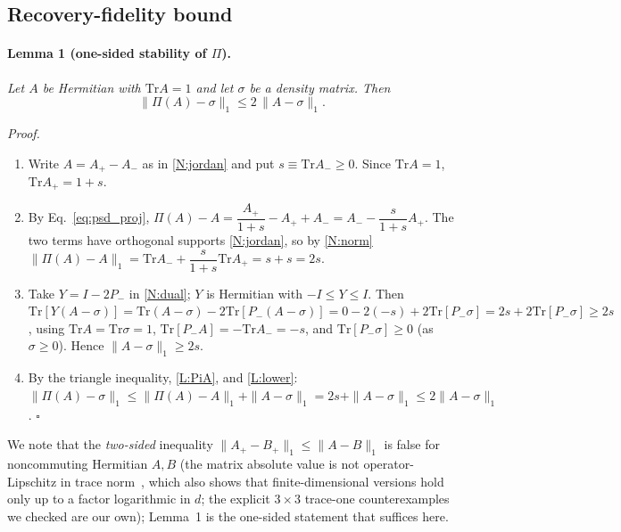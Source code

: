 \documentclass[12pt,a4paper]{article}
\newcommand{\tr}{\mathrm{Tr}}
\begin{document}
\subsection{Recovery-fidelity bound}
\label{sec:lipschitz_proof}

\paragraph{Lemma 1 (one-sided stability of $\Pi$).}
\label{lemma:lipschitz}
\textit{Let $A$ be Hermitian with $\tr A = 1$ and let $\sigma$ be a density matrix. Then}
\begin{equation}
\|\Pi(A) - \sigma\|_1 \leq 2\,\|A - \sigma\|_1 .
\label{eq:lemma1}
\end{equation}

\noindent\textit{Proof.}
\begin{enumerate}[label=(L\arabic*),leftmargin=3em]
\item \label{L:setup} Write $A = A_+ - A_-$ as in \ref{N:jordan} and put $s \equiv \tr A_- \geq 0$. Since $\tr A = 1$, $\tr A_+ = 1 + s$.
\item \label{L:PiA} By Eq.~\eqref{eq:psd_proj}, $\Pi(A) - A = \dfrac{A_+}{1+s} - A_+ + A_- = A_- - \dfrac{s}{1+s}A_+$.
The two terms have orthogonal supports \ref{N:jordan}, so by \ref{N:norm}
$\|\Pi(A) - A\|_1 = \tr A_- + \dfrac{s}{1+s}\tr A_+ = s + s = 2s$.
\item \label{L:lower} Take $Y = I - 2P_-$ in \ref{N:dual}; $Y$ is Hermitian with $-I \leq Y \leq I$. Then
$\tr[Y(A - \sigma)] = \tr(A - \sigma) - 2\tr[P_-(A - \sigma)] = 0 - 2(-s) + 2\tr[P_-\sigma] = 2s + 2\tr[P_-\sigma] \geq 2s$,
using $\tr A = \tr\sigma = 1$, $\tr[P_- A] = -\tr A_- = -s$, and $\tr[P_-\sigma] \geq 0$ (as $\sigma \geq 0$). Hence $\|A - \sigma\|_1 \geq 2s$.
\item \label{L:tri} By the triangle inequality, \ref{L:PiA}, and \ref{L:lower}:
$\|\Pi(A) - \sigma\|_1 \leq \|\Pi(A) - A\|_1 + \|A - \sigma\|_1 = 2s + \|A - \sigma\|_1 \leq 2\|A - \sigma\|_1$. \hfill$\square$
\end{enumerate}
We note that the \emph{two-sided} inequality $\|A_+ - B_+\|_1 \leq \|A - B\|_1$ is false for noncommuting Hermitian $A,B$ (the matrix absolute value is not operator-Lipschitz in trace norm~\cite{Davies1988}, which also shows that finite-dimensional versions hold only up to a factor logarithmic in $d$; the explicit $3\times3$ trace-one counterexamples we checked are our own); Lemma~1 is the one-sided statement that suffices here.
\end{document}
